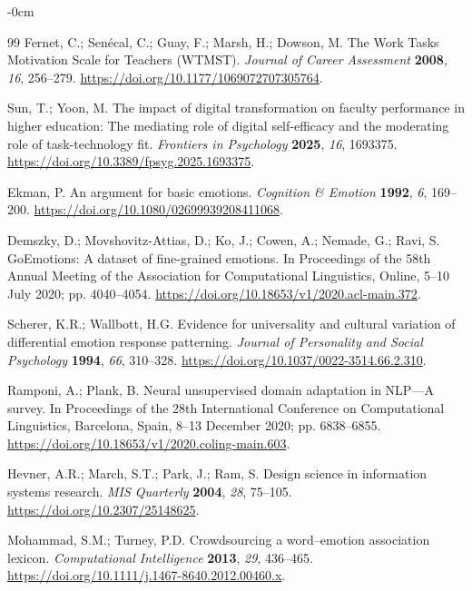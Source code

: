 \documentclass[higheredu,article,submit,pdftex,moreauthors]{Definitions/mdpi}
\begin{document}
\begin{adjustwidth}{-\extralength}{0cm}
\begin{thebibliography}{99}
Fernet, C.; Sen\'ecal, C.; Guay, F.; Marsh, H.; Dowson, M. The Work Tasks Motivation Scale for Teachers (WTMST). \textit{Journal of Career Assessment} \textbf{2008}, \textit{16}, 256--279. \href{https://doi.org/10.1177/1069072707305764}{https://doi.org/10.1177/1069072707305764}.

Sun, T.; Yoon, M. The impact of digital transformation on faculty performance in higher education: The mediating role of digital self-efficacy and the moderating role of task-technology fit. \textit{Frontiers in Psychology} \textbf{2025}, \textit{16}, 1693375. \href{https://doi.org/10.3389/fpsyg.2025.1693375}{https://doi.org/10.3389/fpsyg.2025.1693375}.

Ekman, P. An argument for basic emotions. \textit{Cognition \& Emotion} \textbf{1992}, \textit{6}, 169--200. \href{https://doi.org/10.1080/02699939208411068}{https://doi.org/10.1080/02699939208411068}.

Demszky, D.; Movshovitz-Attias, D.; Ko, J.; Cowen, A.; Nemade, G.; Ravi, S. GoEmotions: A dataset of fine-grained emotions. In Proceedings of the 58th Annual Meeting of the Association for Computational Linguistics, Online, 5--10 July 2020; pp. 4040--4054. \href{https://doi.org/10.18653/v1/2020.acl-main.372}{https://doi.org/10.18653/v1/2020.acl-main.372}.

Scherer, K.R.; Wallbott, H.G. Evidence for universality and cultural variation of differential emotion response patterning. \textit{Journal of Personality and Social Psychology} \textbf{1994}, \textit{66}, 310--328. \href{https://doi.org/10.1037/0022-3514.66.2.310}{https://doi.org/10.1037/0022-3514.66.2.310}.

Ramponi, A.; Plank, B. Neural unsupervised domain adaptation in NLP---A survey. In Proceedings of the 28th International Conference on Computational Linguistics, Barcelona, Spain, 8--13 December 2020; pp. 6838--6855. \href{https://doi.org/10.18653/v1/2020.coling-main.603}{https://doi.org/10.18653/v1/2020.coling-main.603}.

Hevner, A.R.; March, S.T.; Park, J.; Ram, S. Design science in information systems research. \textit{MIS Quarterly} \textbf{2004}, \textit{28}, 75--105. \href{https://doi.org/10.2307/25148625}{https://doi.org/10.2307/25148625}.

Mohammad, S.M.; Turney, P.D. Crowdsourcing a word--emotion association lexicon. \textit{Computational Intelligence} \textbf{2013}, \textit{29}, 436--465. \href{https://doi.org/10.1111/j.1467-8640.2012.00460.x}{https://doi.org/10.1111/j.1467-8640.2012.00460.x}.


\end{thebibliography}
\end{adjustwidth}
\end{document}
